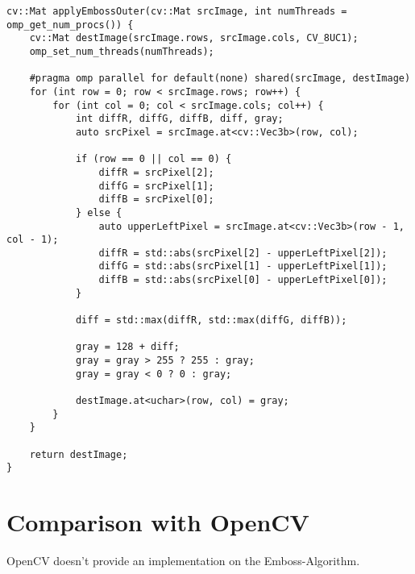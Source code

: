 \begin{listing}[H]
    \begin{verbatim}
cv::Mat applyEmbossOuter(cv::Mat srcImage, int numThreads = omp_get_num_procs()) {
    cv::Mat destImage(srcImage.rows, srcImage.cols, CV_8UC1);
    omp_set_num_threads(numThreads);

    #pragma omp parallel for default(none) shared(srcImage, destImage)
    for (int row = 0; row < srcImage.rows; row++) {
        for (int col = 0; col < srcImage.cols; col++) {
            int diffR, diffG, diffB, diff, gray;
            auto srcPixel = srcImage.at<cv::Vec3b>(row, col);

            if (row == 0 || col == 0) {
                diffR = srcPixel[2];
                diffG = srcPixel[1];
                diffB = srcPixel[0];
            } else {
                auto upperLeftPixel = srcImage.at<cv::Vec3b>(row - 1, col - 1);
                diffR = std::abs(srcPixel[2] - upperLeftPixel[2]);
                diffG = std::abs(srcPixel[1] - upperLeftPixel[1]);
                diffB = std::abs(srcPixel[0] - upperLeftPixel[0]);
            }

            diff = std::max(diffR, std::max(diffG, diffB));

            gray = 128 + diff;
            gray = gray > 255 ? 255 : gray;
            gray = gray < 0 ? 0 : gray;

            destImage.at<uchar>(row, col) = gray;
        }
    }

    return destImage;
}
    \end{verbatim}
    \label{listing:emboss}
\end{listing}

\section{Comparison with OpenCV}

OpenCV doesn't provide an implementation on the Emboss-Algorithm.